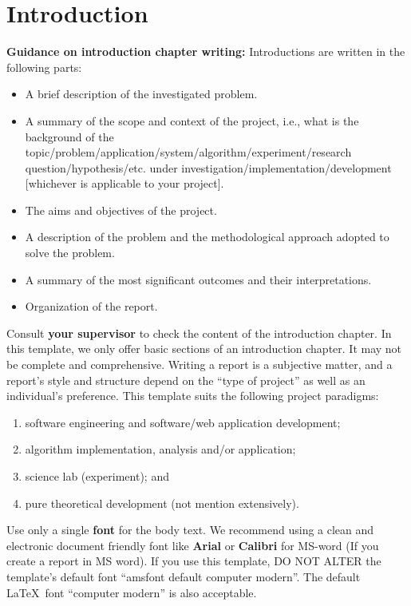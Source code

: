 \chapter{Introduction}
\label{ch:into} %

\cite{Gebrechorkos2019}

\textbf{Guidance on introduction chapter writing:} Introductions are written in the following parts:
\begin{itemize}
    \item A brief  description of the investigated problem.
    \item A summary of the scope and context of the project, i.e., what is the background of the topic/problem/application/system/algorithm/experiment/research question/hypothesis/etc. under investigation/implementation/development [whichever is applicable to your project].
    \item The aims and objectives of the project.
    \item A description of the problem and the methodological approach adopted to solve the problem.
    \item A summary of the most significant outcomes and their interpretations.
    \item Organization of the report. 
\end{itemize}


Consult \textbf{your supervisor} to check the content of the introduction chapter. In this template, we only offer basic sections of an introduction chapter. It may  not be complete and comprehensive. Writing a report is a subjective matter, and a report's style and structure depend on the ``type of project'' as well as an individual's preference. This template suits the following project paradigms:
\begin{enumerate}
    \item software engineering and software/web application development;
    \item algorithm implementation, analysis and/or application;  
    \item science lab (experiment); and
    \item pure theoretical development (not mention extensively).
\end{enumerate}

Use only a single \textbf{font} for the body text. We recommend using a clean and electronic document friendly font like \textbf{Arial} or \textbf{Calibri} for MS-word (If you create a report in MS word). If you use this template, DO NOT ALTER the template's default font ``amsfont default computer modern''. The default \LaTeX~font ``computer modern'' is also acceptable. 

